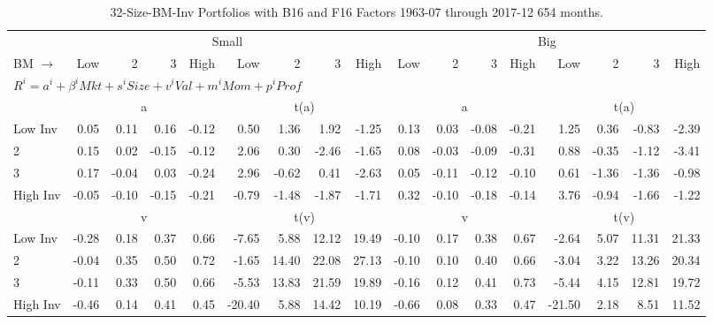 
\begin{table}[!ht]
\scriptsize
\centering
\caption{32-Size-BM-Inv Portfolios with B16 and F16 Factors 1963-07 through
2017-12 654 months.}
\begin{tabular}{lrrrrrrrrrrrrrrrr}
  \toprule
     & \multicolumn{8}{c}{Small} & \multicolumn{8}{c}{Big}  \\
     \cmidrule(r){2-9} \cmidrule(r){10-17}
    BM $\rightarrow$ & Low & 2 & 3 & High & Low & 2 & 3 & High & Low & 2 & 3 & High & Low & 2 & 3 & High  \\ 
  \midrule
  \multicolumn{17}{l}{$R^i=a^i+\beta^iMkt+s^iSize+v^iVal+m^iMom+p^iProf$}  \\
  
     & \multicolumn{4}{c}{a} & \multicolumn{4}{c}{t(a)}  & \multicolumn{4}{c}{a} & \multicolumn{4}{c}{t(a)}   \\
     \cmidrule(r){2-5} \cmidrule(r){6-9}  \cmidrule(r){10-13} \cmidrule(r){14-17} 
    Low Inv  & 0.05  & 0.11  & 0.16  & -0.12  & 0.50  & 1.36  & 1.92  & -1.25  & 0.13  & 0.03  & -0.08  & -0.21  & 1.25  & 0.36  & -0.83  & -2.39   \\
    2  & 0.15  & 0.02  & -0.15  & -0.12  & 2.06  & 0.30  & -2.46  & -1.65  & 0.08  & -0.03  & -0.09  & -0.31  & 0.88  & -0.35  & -1.12  & -3.41   \\
    3  & 0.17  & -0.04  & 0.03  & -0.24  & 2.96  & -0.62  & 0.41  & -2.63  & 0.05  & -0.11  & -0.12  & -0.10  & 0.61  & -1.36  & -1.36  & -0.98   \\
    High Inv  & -0.05  & -0.10  & -0.15  & -0.21  & -0.79  & -1.48  & -1.87  & -1.71  & 0.32  & -0.10  & -0.18  & -0.14  & 3.76  & -0.94  & -1.66  & -1.22   \\
    
  
     & \multicolumn{4}{c}{v} & \multicolumn{4}{c}{t(v)}  & \multicolumn{4}{c}{v} & \multicolumn{4}{c}{t(v)}   \\
     \cmidrule(r){2-5} \cmidrule(r){6-9}  \cmidrule(r){10-13} \cmidrule(r){14-17} 
    Low Inv  & -0.28  & 0.18  & 0.37  & 0.66  & -7.65  & 5.88  & 12.12  & 19.49  & -0.10  & 0.17  & 0.38  & 0.67  & -2.64  & 5.07  & 11.31  & 21.33   \\
    2  & -0.04  & 0.35  & 0.50  & 0.72  & -1.65  & 14.40  & 22.08  & 27.13  & -0.10  & 0.10  & 0.40  & 0.66  & -3.04  & 3.22  & 13.26  & 20.34   \\
    3  & -0.11  & 0.33  & 0.50  & 0.66  & -5.53  & 13.83  & 21.59  & 19.89  & -0.16  & 0.12  & 0.41  & 0.73  & -5.44  & 4.15  & 12.81  & 19.72   \\
    High Inv  & -0.46  & 0.14  & 0.41  & 0.45  & -20.40  & 5.88  & 14.42  & 10.19  & -0.66  & 0.08  & 0.33  & 0.47  & -21.50  & 2.18  & 8.51  & 11.52   \\
    

\end{tabular}
\end{table}
